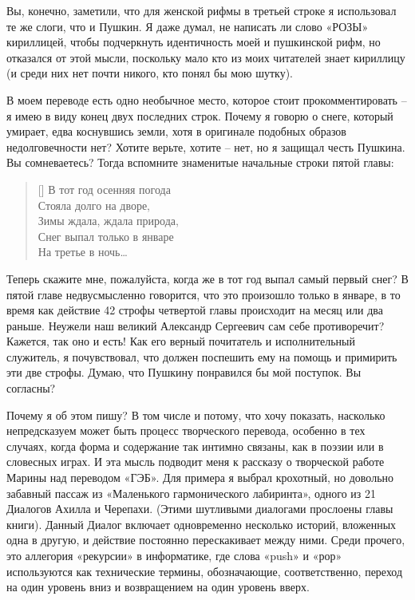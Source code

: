 \documentclass[../main.tex]{subfiles}
\begin{document}
Вы, конечно, заметили, что для женской рифмы в третьей строке я использовал те же слоги, что и Пушкин. Я даже думал, не написать ли слово «РОЗЫ» кириллицей, чтобы подчеркнуть идентичность моей и пушкинской рифм, но отказался от этой мысли, поскольку мало кто из моих читателей знает кириллицу (и среди них нет почти никого, кто понял бы мою шутку).

В моем переводе есть одно необычное место, которое стоит прокомментировать \--- я имею в виду конец двух последних строк. Почему я говорю о снеге, который умирает, едва коснувшись земли, хотя в оригинале подобных образов недолговечности нет? Хотите верьте, хотите \--- нет, но я защищал честь Пушкина. Вы сомневаетесь? Тогда вспомните знаменитые начальные строки пятой главы:

\settowidth{\versewidth}{Зимы ждала, ждала природа,}
\begin{verse}[\versewidth]
    В тот год осенняя погода \\
    Стояла долго на дворе, \\
    Зимы ждала, ждала природа, \\
    Снег выпал только в январе \\
    На третье в ночь\ldots
\end{verse}

Теперь скажите мне, пожалуйста, когда же в тот год выпал самый первый снег? В пятой главе недвусмысленно говорится, что это произошло только в январе, в то время как действие 42 строфы четвертой главы происходит на месяц или два раньше. Неужели наш великий Александр Сергеевич сам себе противоречит? Кажется, так оно и есть! Как его верный почитатель и исполнительный служитель, я почувствовал, что должен поспешить ему на помощь и примирить эти две строфы. Думаю, что Пушкину понравился бы мой поступок. Вы согласны?

Почему я об этом пишу? В том числе и потому, что хочу показать, насколько непредсказуем может быть процесс творческого перевода, особенно в тех случаях, когда форма и содержание так интимно связаны, как в поэзии или в словесных играх. И эта мысль подводит меня к рассказу о творческой работе Марины над переводом «ГЭБ». Для примера я выбрал крохотный, но довольно забавный пассаж из «Маленького гармонического лабиринта», одного из 21 Диалогов Ахилла и Черепахи. (Этими шутливыми диалогами прослоены главы книги). Данный Диалог включает одновременно несколько историй, вложенных одна в другую, и действие постоянно перескакивает между ними. Среди прочего, это аллегория «рекурсии» в информатике, где слова «push» и «рор» используются как технические термины, обозначающие, соответственно, переход на один уровень вниз и возвращением на один уровень вверх.
\end{document}
